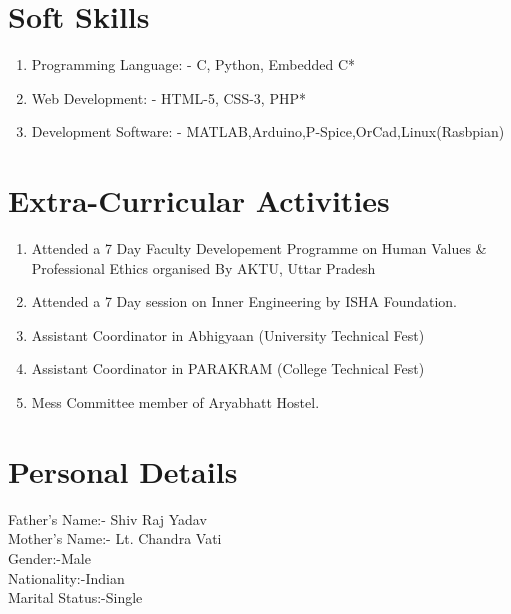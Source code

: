 \documentclass[12pt]{article}
\begin{document}
\section*{Soft Skills}
\begin{enumerate}

  \item Programming Language: - C, Python, Embedded C*
  \item Web Development: - HTML-5, CSS-3, PHP*
  \item Development Software: - MATLAB,Arduino,P-Spice,OrCad,Linux(Rasbpian)
  \end{enumerate}
  
\section*{Extra-Curricular Activities}
\begin{enumerate}
\item Attended a 7 Day Faculty Developement Programme on Human Values \& Professional Ethics organised By
AKTU, Uttar Pradesh
\item Attended a 7 Day session on Inner Engineering by ISHA Foundation.
\item Assistant Coordinator in Abhigyaan (University Technical Fest)
\item Assistant Coordinator in PARAKRAM (College Technical Fest)
\item Mess Committee member of Aryabhatt Hostel.
\end{enumerate}


\section*{Personal Details}
{\large {Father's Name:- \hspace{1.1cm} Shiv Raj Yadav\\
Mother's Name:- \hspace{1cm} Lt. Chandra Vati\\
Gender:-\hspace{2.9cm}Male\\
Nationality:-\hspace{2.0cm}Indian\\
Marital Status:-\hspace{1.4cm}Single\\
}}
\end{document}
